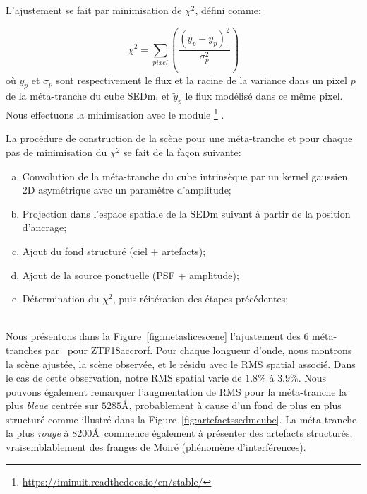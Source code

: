 \documentclass[../main/main.tex]{subfiles}
\begin{document}
L'ajustement se fait par minimisation de $\chi^{2}$, défini comme:

\begin{equation}
  \label{eq:chi2hypergal}
  \chi^{2}=\sum\limits_{pixel}\left(\frac{(y_{p} - \widetilde{y}_{p})^{2}}{\sigma_{p}^{2}}\right)
\end{equation}
où $y_{p}$ et $\sigma_{p}$ sont respectivement le flux et la racine de
la variance dans un pixel $p$ de la méta-tranche du cube SEDm, et
$\widetilde{y}_{p}$ le flux modélisé dans ce même pixel.
Nous effectuons la minimisation avec le module
\footnote{\url{https://iminuit.readthedocs.io/en/stable/}} \citep{James:1975dr,iminuit}.

La procédure de construction de la scène pour une méta-tranche et pour
chaque pas de minimisation du $\chi^{2}$ se fait de la façon
suivante:

\begin{minipage}{\textwidth}%
  \begin{enumerate}[(a)]
    \itemsep=0em
  \item Convolution de la méta-tranche du cube intrinsèque par un kernel
    gaussien 2D asymétrique avec un paramètre d'amplitude;
  \item Projection dans l'espace spatiale de la SEDm suivant à partir de
    la position d'ancrage;
  \item Ajout du fond structuré (ciel + artefacts);
  \item Ajout de la source ponctuelle (PSF + amplitude);
  \item Détermination du $\chi^{2}$, puis réitération des étapes précédentes;
  \end{enumerate}
\end{minipage}\\

Nous présentons dans la Figure~\ref{fig:metaslicescene} l'ajustement des
$6$ méta-tranches par \hypergal\ pour ZTF18accrorf. Pour chaque longueur
d'onde, nous montrons la scène ajustée, la scène observée, et le résidu
avec le RMS spatial associé. Dans le cas de cette observation, notre RMS
spatial varie de $1.8\%$ à $3.9\%$. Nous pouvons également remarquer
l'augmentation de RMS pour la méta-tranche la plus \textit{bleue}
centrée sur $5285$\AA, probablement à cause d'un fond de plus en plus
structuré comme illustré dans la Figure~\ref{fig:artefactssedmcube}. La
méta-tranche la plus \textit{rouge} à $8200$\AA\ commence également à
présenter des artefacts structurés, vraisemblablement des franges de
Moiré (phénomène d'interférences).
\end{document}
